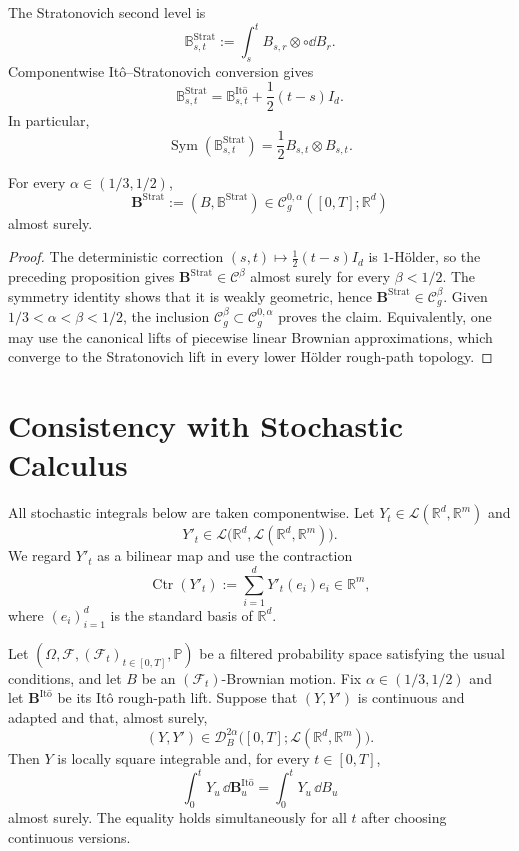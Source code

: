 The Stratonovich second level is
\[
  \mathbb B^{\mathrm{Strat}}_{s,t}
  :=\int_s^t B_{s,r}\otimes\circ\dd B_r.
\]
Componentwise It\^o--Stratonovich conversion gives
\[
  \mathbb B^{\mathrm{Strat}}_{s,t}
  =\mathbb B^{\mathrm{It\hat{o}}}_{s,t}
   +\frac12(t-s)I_d.
\]
In particular,
\[
  \operatorname{Sym}(\mathbb B^{\mathrm{Strat}}_{s,t})
  =\frac12B_{s,t}\otimes B_{s,t}.
\]

\begin{prop}
For every $\alpha\in(1/3,1/2)$,
\[
  \mathbf B^{\mathrm{Strat}}
  :=(B,\mathbb B^{\mathrm{Strat}})
  \in\mathscr C_g^{0,\alpha}([0,T];\mathbb R^d)
\]
almost surely.
\end{prop}

\begin{proof}
The deterministic correction $(s,t)\mapsto\frac12(t-s)I_d$ is
$1$-Hölder, so the preceding proposition gives
$\mathbf B^{\mathrm{Strat}}\in\mathscr C^\beta$ almost surely for every
$\beta<1/2$.  The symmetry identity shows that it is weakly geometric, hence
$\mathbf B^{\mathrm{Strat}}\in\mathscr C_g^\beta$.  Given
$1/3<\alpha<\beta<1/2$, the inclusion
$\mathscr C_g^\beta\subset\mathscr C_g^{0,\alpha}$ proves the claim.
Equivalently, one may use the canonical lifts of piecewise linear Brownian
approximations, which converge to the Stratonovich lift in every lower
Hölder rough-path topology.
\end{proof}

\section{Consistency with Stochastic Calculus}

All stochastic integrals below are taken componentwise.  Let
$Y_t\in\mathcal L(\mathbb R^d,\mathbb R^m)$ and
\[
  Y'_t\in
  \mathcal L\bigl(\mathbb R^d,
                  \mathcal L(\mathbb R^d,\mathbb R^m)\bigr).
\]
We regard $Y'_t$ as a bilinear map and use the contraction
\[
  \operatorname{Ctr}(Y'_t)
  :=\sum_{i=1}^dY'_t(e_i)e_i\in\mathbb R^m,
\]
where $(e_i)_{i=1}^d$ is the standard basis of $\mathbb R^d$.

\begin{prop}
Let
$(\Omega,\mathcal F,(\mathcal F_t)_{t\in[0,T]},\mathbb P)$ be a filtered
probability space satisfying the usual conditions, and let $B$ be an
$(\mathcal F_t)$-Brownian motion.  Fix $\alpha\in(1/3,1/2)$ and let
$\mathbf B^{\mathrm{It\hat{o}}}$ be its It\^o rough-path lift.  Suppose that
$(Y,Y')$ is continuous and adapted and that, almost surely,
\[
  (Y,Y')\in\mathscr D_B^{2\alpha}
  \bigl([0,T];\mathcal L(\mathbb R^d,\mathbb R^m)\bigr).
\]
Then $Y$ is locally square integrable and, for every $t\in[0,T]$,
\[
  \int_0^tY_u\,\dd\mathbf B^{\mathrm{It\hat{o}}}_u
  =\int_0^tY_u\,\dd B_u
\]
almost surely.  The equality holds simultaneously for all $t$ after choosing
continuous versions.
\end{prop}

